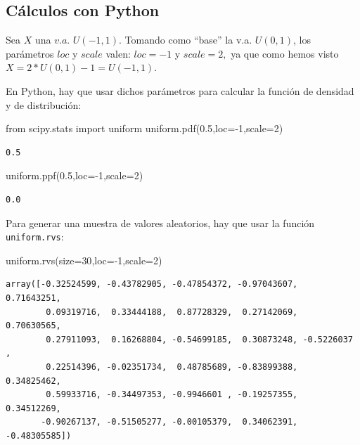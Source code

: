 \documentclass[
  letterpaper,
  DIV=11,
  numbers=noendperiod]{scrreprt}
\newenvironment{Shaded}{\begin{snugshade}}{\end{snugshade}}
\newcommand{\DecValTok}[1]{\textcolor[rgb]{0.68,0.00,0.00}{#1}}
\newcommand{\FloatTok}[1]{\textcolor[rgb]{0.68,0.00,0.00}{#1}}
\newcommand{\ImportTok}[1]{\textcolor[rgb]{0.00,0.46,0.62}{#1}}
\newcommand{\NormalTok}[1]{\textcolor[rgb]{0.00,0.23,0.31}{#1}}
\newcommand{\OperatorTok}[1]{\textcolor[rgb]{0.37,0.37,0.37}{#1}}
\begin{document}
\subsection{Cálculos con Python}\label{cuxe1lculos-con-python-3}

Sea \(X\) una \(v.a.\) \(U(-1,1)\). Tomando como ``base'' la v.a.
\(U(0,1)\), los parámetros \(loc\) y \(scale\) valen: \(loc=-1\) y
\(scale=2,\) ya que como hemos visto \(X=2*U(0,1)-1=U(-1,1)\).

En Python, hay que usar dichos parámetros para calcular la función de
densidad y de distribución:

\begin{Shaded}
\begin{Highlighting}[]
\ImportTok{from}\NormalTok{ scipy.stats }\ImportTok{import}\NormalTok{ uniform}
\NormalTok{uniform.pdf(}\FloatTok{0.5}\NormalTok{,loc}\OperatorTok{={-}}\DecValTok{1}\NormalTok{,scale}\OperatorTok{=}\DecValTok{2}\NormalTok{)}
\end{Highlighting}
\end{Shaded}

\begin{verbatim}
0.5
\end{verbatim}

\begin{Shaded}
\begin{Highlighting}[]
\NormalTok{uniform.ppf(}\FloatTok{0.5}\NormalTok{,loc}\OperatorTok{={-}}\DecValTok{1}\NormalTok{,scale}\OperatorTok{=}\DecValTok{2}\NormalTok{)}
\end{Highlighting}
\end{Shaded}

\begin{verbatim}
0.0
\end{verbatim}

Para generar una muestra de valores aleatorios, hay que usar la función
\texttt{uniform.rvs}:

\begin{Shaded}
\begin{Highlighting}[]
\NormalTok{uniform.rvs(size}\OperatorTok{=}\DecValTok{30}\NormalTok{,loc}\OperatorTok{={-}}\DecValTok{1}\NormalTok{,scale}\OperatorTok{=}\DecValTok{2}\NormalTok{)}
\end{Highlighting}
\end{Shaded}

\begin{verbatim}
array([-0.32524599, -0.43782905, -0.47854372, -0.97043607,  0.71643251,
        0.09319716,  0.33444188,  0.87728329,  0.27142069,  0.70630565,
        0.27911093,  0.16268804, -0.54699185,  0.30873248, -0.5226037 ,
        0.22514396, -0.02351734,  0.48785689, -0.83899388,  0.34825462,
        0.59933716, -0.34497353, -0.9946601 , -0.19257355,  0.34512269,
       -0.90267137, -0.51505277, -0.00105379,  0.34062391, -0.48305585])
\end{verbatim}
\end{document}
